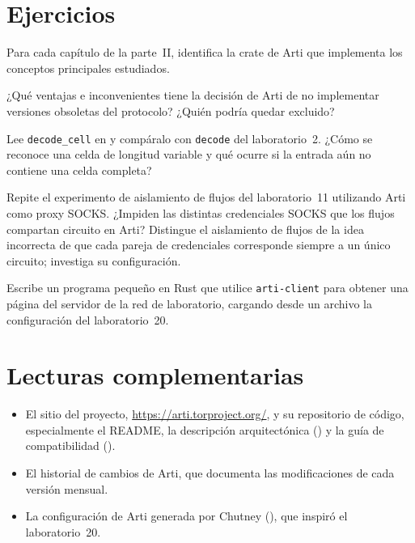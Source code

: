 \section*{Ejercicios}

\begin{esercizio}[1]\label{es:30-crate}
Para cada capítulo de la parte~II, identifica la crate de Arti que implementa los conceptos principales estudiados.
\end{esercizio}

\begin{esercizio}[1]\label{es:30-obsoleto}
¿Qué ventajas e inconvenientes tiene la decisión de Arti de no implementar versiones obsoletas del protocolo? ¿Quién podría quedar excluido?
\end{esercizio}

\begin{esercizio}[2]\label{es:30-cella}
Lee \texttt{decode\_cell} en  y compáralo con \texttt{decode} del laboratorio~2. ¿Cómo se reconoce una celda de longitud variable y qué ocurre si la entrada aún no contiene una celda completa?
\end{esercizio}

\begin{esercizio}[2]\label{es:30-isolamento}
Repite el experimento de aislamiento de flujos del laboratorio~11 utilizando Arti como proxy SOCKS. ¿Impiden las distintas credenciales SOCKS que los flujos compartan circuito en Arti? Distingue el aislamiento de flujos de la idea incorrecta de que cada pareja de credenciales corresponde siempre a un único circuito; investiga su configuración.
\end{esercizio}

\begin{esercizio}[3]\label{es:30-libreria}
Escribe un programa pequeño en Rust que utilice \texttt{arti-client} para obtener una página del servidor de la red de laboratorio, cargando desde un archivo la configuración del laboratorio~20.
\end{esercizio}

\section*{Lecturas complementarias}
\begin{itemize}
  \item El sitio del proyecto, \url{https://arti.torproject.org/}, y su repositorio de código, especialmente el README, la descripción arquitectónica () y la guía de compatibilidad ().
  \item El historial de cambios de Arti, que documenta las modificaciones de cada versión mensual.
  \item La configuración de Arti generada por Chutney (), que inspiró el laboratorio~20.
\end{itemize}
